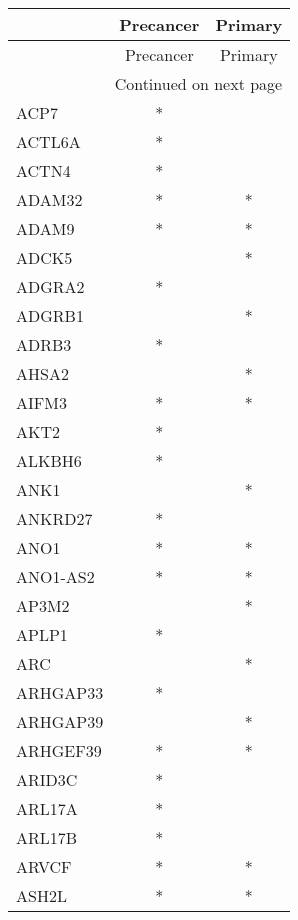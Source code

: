 \begin{longtable}{lcc}
\toprule
{} & Precancer & Primary \\
\midrule
\endfirsthead

\toprule
{} & Precancer & Primary \\
\midrule
\endhead
\midrule
\multicolumn{3}{r}{{Continued on next page}} \\
\midrule
\endfoot

\bottomrule
\endlastfoot
ACP7         &         * &         \\
ACTL6A       &         * &         \\
ACTN4        &         * &         \\
ADAM32       &         * &       * \\
ADAM9        &         * &       * \\
ADCK5        &           &       * \\
ADGRA2       &         * &         \\
ADGRB1       &           &       * \\
ADRB3        &         * &         \\
AHSA2        &           &       * \\
AIFM3        &         * &       * \\
AKT2         &         * &         \\
ALKBH6       &         * &         \\
ANK1         &           &       * \\
ANKRD27      &         * &         \\
ANO1         &         * &       * \\
ANO1-AS2     &         * &       * \\
AP3M2        &           &       * \\
APLP1        &         * &         \\
ARC          &           &       * \\
ARHGAP33     &         * &         \\
ARHGAP39     &           &       * \\
ARHGEF39     &         * &       * \\
ARID3C       &         * &         \\
ARL17A       &         * &         \\
ARL17B       &         * &         \\
ARVCF        &         * &       * \\
ASH2L        &         * &       * \\

\end{longtable}

